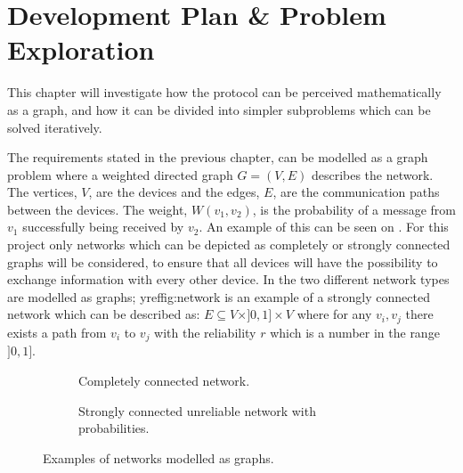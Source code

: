 \chapter{Development Plan \& Problem Exploration}\label{chp:Problems}
This chapter will investigate how the protocol can be perceived mathematically as a graph, and how it can be divided into simpler subproblems which can be solved iteratively.

The requirements stated in the previous chapter, can be modelled as a graph problem where a weighted directed graph $G = (V, E)$ describes the network. 
The vertices, $V$, are the devices and the edges, $E$, are the communication paths between the devices. 
The weight, $W(v_1, v_2)$, is the probability of a message from $v_1$ successfully being received by $v_2$.
An example of this can be seen on .
For this project only networks which can be depicted as completely or strongly connected graphs will be considered, to ensure that all devices will have the possibility to exchange information with every other device.
In  the two different network types are modelled as graphs; \m
yref{fig:network} is an example of a strongly connected network which can be described as: $E \subseteq V \times ]0,1] \times V$ where for any $v_i, v_j$ there exists a path from $v_i$ to $v_j$ with the reliability $r$ which is a number in the range $]0,1]$.

\begin{figure}[h]
    \begin{subfigure}{0.5\linewidth}
        \centering
        
        \caption{Completely connected network.}
        \label{fig:ccrcnetworkgraph}
    \end{subfigure}\hfill
    \begin{subfigure}{0.5\linewidth}
        \centering
        
        \caption{Strongly connected unreliable network with probabilities.}
        \label{fig:network}
    \end{subfigure}
    \caption{Examples of networks modelled as graphs.}
    \label{fig:examplenetworkgraphs} 
\end{figure}

